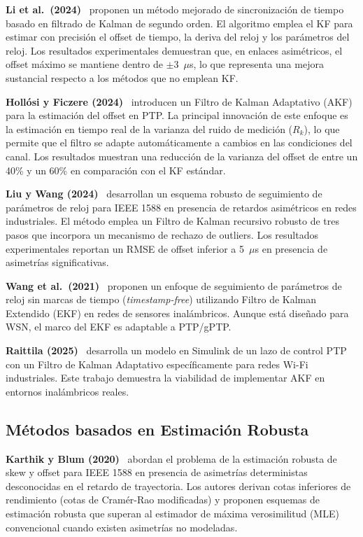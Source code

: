 \textbf{Li et al.\ (2024)}~\cite{li2024} proponen un método mejorado de sincronización de tiempo basado en filtrado de Kalman de segundo orden. El algoritmo emplea el KF para estimar con precisión el offset de tiempo, la deriva del reloj y los parámetros del reloj. Los resultados experimentales demuestran que, en enlaces asimétricos, el offset máximo se mantiene dentro de $\pm 3$~$\mu$s, lo que representa una mejora sustancial respecto a los métodos que no emplean KF.

\textbf{Hollósi y Ficzere (2024)}~\cite{hollosi2024} introducen un Filtro de Kalman Adaptativo (AKF) para la estimación del offset en PTP. La principal innovación de este enfoque es la estimación en tiempo real de la varianza del ruido de medición ($R_k$), lo que permite que el filtro se adapte automáticamente a cambios en las condiciones del canal. Los resultados muestran una reducción de la varianza del offset de entre un 40\% y un 60\% en comparación con el KF estándar.

\textbf{Liu y Wang (2024)}~\cite{liu2024} desarrollan un esquema robusto de seguimiento de parámetros de reloj para IEEE 1588 en presencia de retardos asimétricos en redes industriales. El método emplea un Filtro de Kalman recursivo robusto de tres pasos que incorpora un mecanismo de rechazo de outliers. Los resultados experimentales reportan un RMSE de offset inferior a 5~$\mu$s en presencia de asimetrías significativas.

\textbf{Wang et al.\ (2021)}~\cite{wang2021} proponen un enfoque de seguimiento de parámetros de reloj sin marcas de tiempo (\textit{timestamp-free}) utilizando Filtro de Kalman Extendido (EKF) en redes de sensores inalámbricos. Aunque está diseñado para WSN, el marco del EKF es adaptable a PTP/gPTP.

\textbf{Raittila (2025)}~\cite{raittila2025} desarrolla un modelo en Simulink de un lazo de control PTP con un Filtro de Kalman Adaptativo específicamente para redes Wi-Fi industriales. Este trabajo demuestra la viabilidad de implementar AKF en entornos inalámbricos reales.

\subsection{Métodos basados en Estimación Robusta}
\label{sec:2.2.3}

\textbf{Karthik y Blum (2020)}~\cite{karthik2020} abordan el problema de la estimación robusta de skew y offset para IEEE 1588 en presencia de asimetrías deterministas desconocidas en el retardo de trayectoria. Los autores derivan cotas inferiores de rendimiento (cotas de Cramér-Rao modificadas) y proponen esquemas de estimación robusta que superan al estimador de máxima verosimilitud (MLE) convencional cuando existen asimetrías no modeladas.

